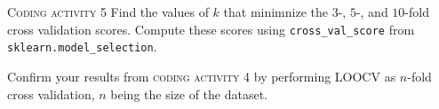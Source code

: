 \documentclass[xcolor={dvipsnames}]{beamer}
\begin{document}
\begin{frame}{\textsc{Coding activity 5}}
    Find the values of $k$ that minimnize the $3$-, $5$-, and $10$-fold cross validation scores.
    Compute these scores using \texttt{cross\_val\_score} from \texttt{sklearn.model\_selection}.
    
    Confirm your results from \textsc{coding activity 4} by performing LOOCV as 
    $n$-fold cross validation, $n$ being the size of the dataset.
\end{frame}
\end{document}
